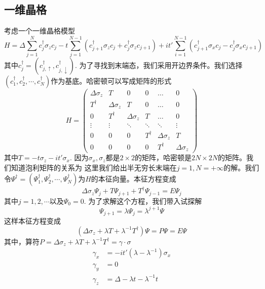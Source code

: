 \documentclass{article}
\numberwithin{equation}{subsection}
\begin{document}
\subsection{一维晶格}
考虑一个一维晶格模型
\begin{equation}
    H=\Delta\sum_{j=1}^{N}c_j^\dagger\sigma_zc_j-t\sum_{j=1}^{N-1}(c_{j+1}^\dagger\sigma_zc_j+c_j^\dagger\sigma_zc_{j+1})+it'\sum_{i=1}^{N-1}(c_{j+1}^\dagger\sigma_xc_j-c_j^\dagger\sigma_xc_{j+1})
\end{equation}
其中$c_j^\dagger=(c_{j,\uparrow}^\dagger,c_{j,\downarrow}^\dagger)$. 为了寻找到末端态，我们采用开边界条件。我们选择$(c_1^\dagger,c_2^\dagger,\cdots,c_N^\dagger)$作为基底。哈密顿可以写成矩阵的形式
\begin{equation}
    H=\left(\begin{array}{cccccc}
        \Delta \sigma_{z} & T & 0 & 0 & \ldots & 0 \\
        T^{\dagger} & \Delta \sigma_{z} & T & 0 & \ldots & 0 \\
        0 & T^{\dagger} & \Delta \sigma_{z} & T & \ldots & 0 \\
        \vdots & \vdots & \ddots & \ddots & \ddots & \vdots \\
        0 & 0 & 0 & T^{\dagger} & \Delta \sigma_{z} & T \\
        0 & 0 & 0 & 0 & T^{\dagger} & \Delta \sigma_{z}
        \end{array}\right)
\end{equation}
其中$T=-t\sigma_z-it'\sigma_x$. 因为$\sigma_x,\sigma_z$都是$2\times 2$的矩阵，哈密顿是$2N\times2N$的矩阵。我们知道泡利矩阵的关系为
这里我们给出半无穷长末端在$j=1,N=+\infty$的解。我们令$\Psi^\dagger=(\Psi_1^\dagger,\Psi_2^\dagger,\cdots,\Psi_N^\dagger)$为$H$的本征向量。本征方程变成
\begin{equation}
    \Delta\sigma_z\Psi_j+T\Psi_{j+1}+T^\dagger\Psi_{j-1}=E\Psi_j
\end{equation}
其中$j=1,2,\cdots$以及$\Psi_0=0$. 为了求解这个方程，我们带入试探解
\begin{equation}
    \Psi_{j+1}=\lambda\Psi_{j}=\lambda^{j+1}\Psi
\end{equation}
这样本征方程变成
\begin{equation}
    (\Delta\sigma_z+\lambda T+\lambda^{-1}T^\dagger)\Psi=P\Psi=E\Psi
\end{equation}
其中，算符$P=\Delta\sigma_z+\lambda T+\lambda^{-1}T^\dagger=\gamma\cdot\sigma$
\begin{equation}
    \begin{split}
        \gamma_x&=-it'(\lambda-\lambda^{-1})\sigma_x\\
        \gamma_y&=0\\
        \gamma_z&=\Delta-\lambda t-\lambda^{-1}t
    \end{split}
\end{equation}
\end{document}
